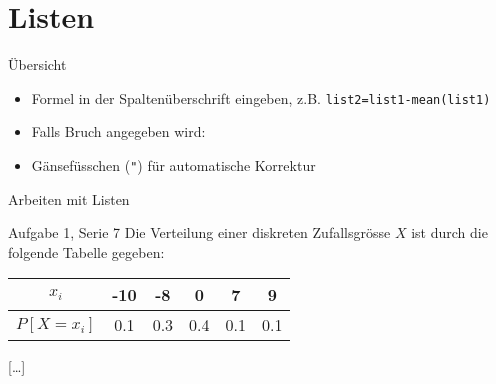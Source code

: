 \documentclass{beamer}
\newlength{\tikey}
\newcommand{\keystroke}[1]{\settowidth{\tikey}{\scriptsize #1}\psframebox[framearc=0.2]{\parbox{\tikey}{\scriptsize #1}}}
\begin{document}
\section{Listen}
\begin{frame}{Übersicht}
\begin{itemize}
\item Formel in der Spaltenüberschrift eingeben, z.B. \texttt{list2=list1-mean(list1)}
\item Falls Bruch angegeben wird: \keystroke{$\Diamondblack$}~\keystroke{ENTER}
\item Gänsefüsschen (\texttt{"}) für automatische Korrektur
\end{itemize}
\end{frame}

\begin{frame}{Arbeiten mit Listen}
\begin{beamerboxesrounded}[shadow]{Aufgabe 1, Serie 7}
Die Verteilung einer diskreten Zufallsgrösse $X$ ist durch die folgende Tabelle gegeben:

\begin{center}\begin{tabular}{c|ccccc}\toprule
$x_i$ & -10 & -8 &  0 & 7 & 9\\\midrule
$P[X = x_i ]$ &  0.1 & 0.3 & 0.4 & 0.1 & 0.1\\\bottomrule
\end{tabular}\end{center}

[\dots]
\end{beamerboxesrounded}
\end{frame}
\end{document}
